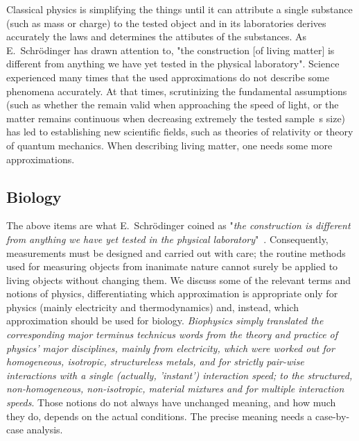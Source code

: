 Classical physics is simplifying the things until it can attribute 
a single substance (such as mass or charge) to the tested object
and in its laboratories derives accurately the laws and determines
the attibutes of the substances. As E.~Schrödinger has drawn attention to, "the construction [of living matter] is different from anything we have yet tested in the physical laboratory".
Science experienced many times that the used approximations do not
describe some phenomena accurately. At that times, scrutinizing the 
fundamental assumptions (such as whether the  remain valid when approaching the speed of light,
or the matter remains continuous when decreasing extremely the 
tested sample~s size) has led to establishing new scientific fields,
such as theories of relativity or theory of quantum mechanics.
When describing living matter, one needs some more approximations.




\subsection{Biology\label{sec:Physics-Biology}}

The above items %
are what E.~Schr\"odinger coined as "\textit{the construction is different from anything we have yet tested in the physical laboratory}"~\cite{Schrodinger:1992}. Consequently, measurements must be designed and carried out with care; the routine
methods used for measuring objects from inanimate nature
cannot surely be applied to living objects without changing them.  
We discuss some of the relevant terms and notions of physics,
differentiating which approximation is appropriate only for physics (mainly electricity and thermodynamics)
and,  instead, which approximation should be used for biology.
\textit{Biophysics simply translated the corresponding major terminus technicus words
from the theory and practice of physics' major disciplines, mainly from electricity, which were
worked out for homogeneous, isotropic, structureless metals,
and for strictly pair-wise interactions with a single (actually, 'instant') interaction speed; to the structured,
non-homogeneous, non-isotropic, material mixtures and for multiple interaction speeds}.
Those notions do not always have unchanged meaning, and how much they do,
depends on the actual conditions. The precise meaning needs a case-by-case analysis.


